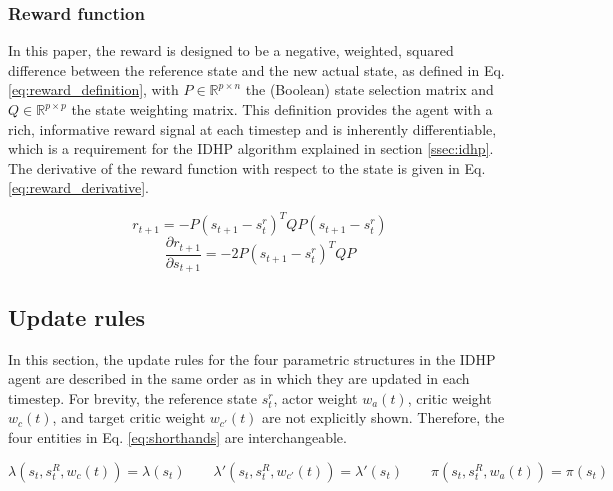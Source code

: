 \subsubsection{Reward function} \label{ssec:rewardfunction}
In this paper, the reward is designed to be a negative, weighted, squared difference between the reference state and the new actual state, as defined in Eq. \eqref{eq:reward_definition}, with $P \in \mathbb{R}^{p \times n}$ the (Boolean) state selection matrix and $Q \in \mathbb{R}^{p \times p}$ the state weighting matrix. This definition provides the agent with a rich, informative reward signal at each timestep and is inherently differentiable, which is a requirement for the IDHP algorithm explained in section \ref{ssec:idhp}. The derivative of the reward function with respect to the state is given in Eq. \eqref{eq:reward_derivative}.

\begin{equation} \label{eq:reward_definition}
    r_{t+1} = -P\left(s_{t+1} - s_t^r\right)^T QP\left(s_{t+1} - s_t^r\right)
\end{equation}
\begin{equation} \label{eq:reward_derivative}
    \frac{\partial r_{t+1}}{\partial s_{t+1}} = -2P\left(s_{t+1} - s_t^r\right)^TQP
\end{equation}

\subsection{Update rules} \label{ssec:updaterules}
In this section, the update rules for the four parametric structures in the IDHP agent are described in the same order as in which they are updated in each timestep. For brevity, the reference state $s_t^r$, actor weight $w_a(t)$, critic weight $w_c(t)$, and target critic weight $w_{c'}(t)$ are not explicitly shown. Therefore, the four entities in Eq. \eqref{eq:shorthands} are interchangeable.

\begin{equation} \label{eq:shorthands}
    \lambda(s_t, s^R_t, w_c(t)) = \lambda(s_t) \qquad \lambda'(s_t, s^R_t, w_{c'}(t)) = \lambda'(s_t) \qquad \pi(s_t, s_t^R, w_a(t)) = \pi(s_t)
\end{equation}

